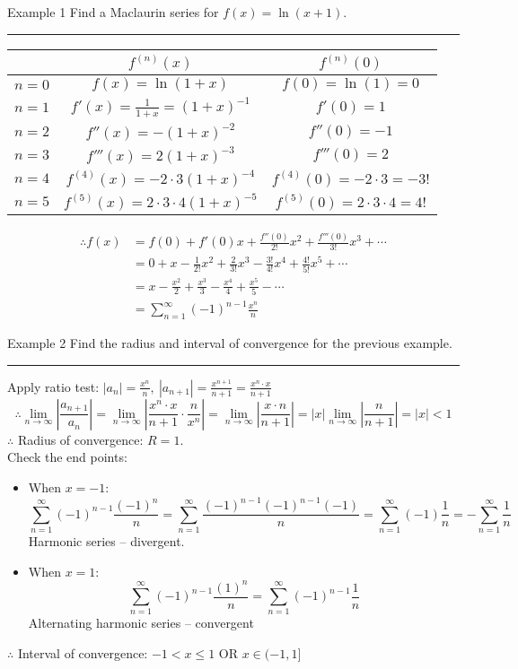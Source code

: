 \documentclass[12pt,a4paper]{article}
\begin{document}
\begin{eg}{Example 1}
	Find a Maclaurin series for $f(x)=\ln{(x+1)}.$\\	
	\noindent\rule[0.25\baselineskip]{\textwidth}{1pt}
	\begin{center}
		\begin{tabular}{c|c|c}
			&$f^{(n)}(x)$ & $f^{(n)}(0)$\\
			\hline
			$n=0$&$f(x)=\ln{(1+x)}$&$f(0)=\ln{(1)}=0$\\
			$n=1$&$f'(x)=\frac{1}{1+x}=(1+x)^{-1}$&$f'(0)=1$\\
			$n=2$&$f''(x)=-(1+x)^{-2}$&$f''(0)=-1$\\
			$n=3$&$f'''(x)=2(1+x)^{-3}$&$f'''(0)=2$\\
			$n=4$&$f^{(4)}(x)=-2\cdot3(1+x)^{-4}$&$f^{(4)}(0)=-2\cdot3=-3!$\\
			$n=5$&$f^{(5)}(x)=2\cdot3\cdot4(1+x)^{-5}$&$f^{(5)}(0)=2\cdot3\cdot4=4!$
		\end{tabular}
	\end{center}
	$$\begin{aligned}
		\therefore f(x)&=f(0)+f'(0)x+\frac{f''(0)}{2!}x^2+\frac{f'''(0)}{3!}x^3+\cdots\\
		&=0+x-\frac{1}{2!}x^2+\frac{2}{3!}x^3-\frac{3!}{4!}x^4+\frac{4!}{5!}x^5+\cdots\\
		&=x-\frac{x^2}{2}+\frac{x^3}{3}-\frac{x^4}{4}+\frac{x^5}{5}-\cdots\\
		&=\sum^\infty_{n=1}(-1)^{n-1}\frac{x^n}{n}
	\end{aligned}$$
\end{eg}
\begin{eg}{Example 2}
	Find the radius and interval of convergence for the previous example. \\
	\noindent\rule[0.25\baselineskip]{\textwidth}{1pt}
	Apply ratio test: $\displaystyle|a_n|=\frac{x^n}{n},\ |a_{n+1}|=\frac{x^{n+1}}{n+1}=\frac{x^n\cdot x}{n+1}$
	$$\therefore\lim_{n\to\infty}\left|\frac{a_{n+1}}{a_n}\right|=\lim_{n\to\infty}\left|\frac{x^n\cdot x}{n+1}\cdot\frac{n}{x^n}\right|=\lim_{n\to\infty}\left|\frac{x\cdot n}{n+1}\right|=|x|\lim_{n\to\infty}\left|\frac{n}{n+1}\right|=|x|<1$$	
	$\therefore$ Radius of convergence: $R=1$.\\
	Check the end points: 
	\begin{itemize}
		\item When $x=-1$: $$\sum^\infty_{n=1}(-1)^{n-1}\frac{(-1)^n}{n}=\sum^\infty_{n=1}\frac{(-1)^{n-1}(-1)^{n-1}(-1)}{n}=\sum^\infty_{n=1}(-1)\frac{1}{n}=-\sum^\infty_{n=1}\frac{1}{n}$$ Harmonic series -- divergent.
		\item When $x=1$: $$\sum^\infty_{n=1}(-1)^{n-1}\frac{(1)^n}{n}=\sum^\infty_{n=1}(-1)^{n-1}\frac{1}{n}$$ Alternating harmonic series -- convergent 
	\end{itemize}
	$\therefore$ Interval of convergence: $-1<x\leq1$ OR $x\in(-1,1]$
\end{eg}
\end{document}
